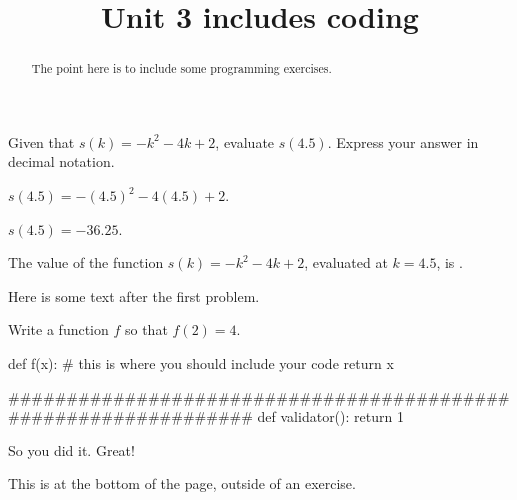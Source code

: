 \documentclass{ximera}
\title{Unit 3 includes coding}
\begin{document}
\begin{abstract}
  The point here is to include some programming exercises.
\end{abstract}

\begin{exercise}
Given that $s(k)=-k^2-4 k+2$, evaluate $s(4.5)$. Express your answer in decimal notation.
\begin{solution}
\begin{hint}
$s(4.5)=-(4.5)^2-4 (4.5)+2$.
\end{hint}
\begin{hint}
$s(4.5)=-36.25$.
\end{hint}
The value of the function $s(k)=-k^2-4 k+2$, evaluated at $k=4.5$, is .
\end{solution}

Here is some text after the first problem.
\end{exercise}

\begin{exercise}
Write a function $f$ so that $f(2) = 4$.

\begin{solution}
\begin{python}
def f(x):
  # this is where you should include your code
  return x

################################################################
def validator():
  return 1
\end{python}
\end{solution}

So you did it.  Great!
\end{exercise}

This is at the bottom of the page, outside of an exercise.
\end{document}
